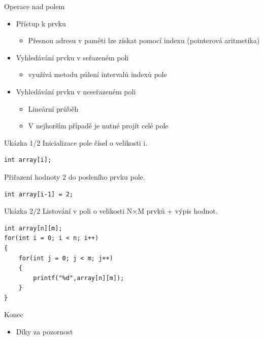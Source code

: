\documentclass[10pt, hyperref={unicode}]{beamer}
\begin{document}
\begin{frame}{Operace nad polem}
\begin{itemize}
    \item Přístup k prvku 
        \begin{itemize}
        \item Přesnou adresu v paměti lze získat pomocí indexu (pointerová aritmetika)
        \end{itemize}
    \item Vyhledávání prvku v seřazeném poli 
        \begin{itemize} 
        \item využívá \alert{metodu půlení intervalů} indexů pole
        \end{itemize}
    \item Vyhledávání prvku v neseřazeném poli
        \begin{itemize}
        \item Lineární průběh
        \item V nejhorším případě je nutné projít celé pole
        \end{itemize}
\end{itemize}
\end{frame}

\lstset{basicstyle=\small,style=CustomStyle}
\begin{frame}[fragile]{Ukázka 1/2}
Inicializace pole čísel o velikosti i.
\begin{lstlisting}
int array[i];
\end{lstlisting}
Přiřazení hodnoty 2 do posleního prvku pole.
\begin{lstlisting}
int array[i-1] = 2;
\end{lstlisting}
\end{frame}

\begin{frame}[fragile]{Ukázka 2/2}
Listování v poli o velikosti N$\times$M prvků + výpis hodnot.
\begin{lstlisting}
int array[n][m];
for(int i = 0; i < n; i++)
{
    for(int j = 0; j < m; j++)
    {
        printf("%d",array[n][m]);
    }
}
\end{lstlisting}
\end{frame}

\begin{frame}{Konec}
\begin{itemize}
    \item Díky za pozornost
\end{itemize}
\end{frame}
\end{document}

